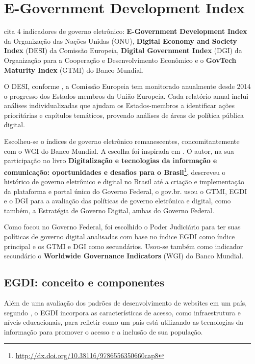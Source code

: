 \chapter{E-Government Development Index}

\cite{martinez2022egovernment} cita 4 indicadores de governo eletrônico: \textbf{E-Government Development Index} da Organização das Nações Unidas (ONU), \textbf{Digital Economy and Society Index} (DESI) da Comissão Europeia, \textbf{Digital Government Index} (DGI) da Organização para a Cooperação e Desenvolvimento Econômico e o \textbf{GovTech Maturity Index} (GTMI) do Banco Mundial.

O DESI, conforme \cite{desi_2022}, a Comissão Europeia tem monitorado anualmente desde 2014 o progresso dos Estados-membros da União Europeia. Cada relatório anual inclui análises individualizadas que ajudam os Estados-membros a identificar ações prioritárias e capítulos temáticos, provendo análises de áreas de política pública digital.

Escolheu-se o índices de governo eletrônico remanescentes, concomitantemente com o WGI do Banco Mundial. A escolha foi inspirada em \cite{mitkiewicz2024transformaccao}. O autor, na sua participação no livro \textbf{Digitalização e tecnologias da informação e comunicação: oportunidades e desafios para o Brasil}\footnote{\url{http://dx.doi.org/10.38116/9786556350660cap8}}, descreveu o histórico de governo eletrônico e digital no Brasil até a criação e implementação da plataforma e portal único do Governo Federal, o gov.br. \cite{mitkiewicz2024transformaccao} usou o GTMI, EGDI e o DGI para a avaliação das políticas de governo eletrônica e digital, como também, a Estratégia de Governo Digital, ambas do Governo Federal.

Como \cite{mitkiewicz2024transformaccao} focou no Governo Federal, foi escolhido o Poder Judiciário para ter suas políticas de governo digital analisadas com base no índice EGDI como índice principal e os GTMI e DGI como secundários. Usou-se também como indicador secundário o \textbf{Worldwide Governance Indicators} (WGI) do Banco Mundial.

\section{EGDI: conceito e componentes}

Além de uma avaliação dos padrões de desenvolvimento de websites em um país, segundo \cite{ONU_EGDI_description}, o EGDI incorpora as características de acesso, como infraestrutura e níveis educacionais, para refletir como um país está utilizando as tecnologias da informação para promover o acesso e a inclusão de sua população. 

